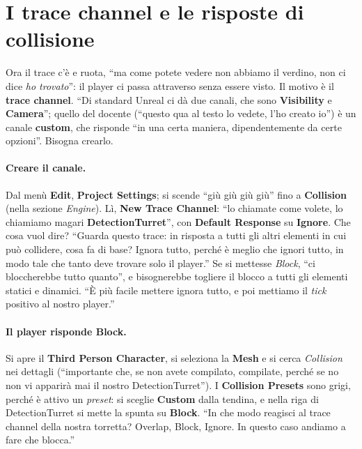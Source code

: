 \section{I trace channel e le risposte di collisione}
\label{ue5:sec:canali}

Ora il trace c'è e ruota, ``ma come potete vedere non abbiamo il verdino, non ci dice
\emph{ho trovato}'': il player ci passa attraverso senza essere visto. Il motivo è il
\textbf{trace channel}. ``Di standard Unreal ci dà due canali, che sono
\textbf{Visibility} e \textbf{Camera}''; quello del docente (``questo qua al testo lo
vedete, l'ho creato io'') è un canale \textbf{custom}, che risponde ``in una certa
maniera, dipendentemente da certe opzioni''. Bisogna crearlo.

\paragraph{Creare il canale.} Dal menù \textbf{Edit}, \textbf{Project Settings}; si scende
``giù giù giù giù'' fino a \textbf{Collision} (nella sezione \emph{Engine}). Lì,
\textbf{New Trace Channel}: ``lo chiamate come volete, lo chiamiamo magari
\textbf{DetectionTurret}'', con \textbf{Default Response} su \textbf{Ignore}. Che cosa
vuol dire? ``Guarda questo trace: in risposta a tutti gli altri elementi in cui può
collidere, cosa fa di base? Ignora tutto, perché è meglio che ignori tutto, in modo tale
che tanto deve trovare solo il player.'' Se si mettesse \emph{Block}, ``ci bloccherebbe
tutto quanto'', e bisognerebbe togliere il blocco a tutti gli elementi statici e
dinamici. ``È più facile mettere ignora tutto, e poi mettiamo il \emph{tick} positivo al
nostro player.''

\paragraph{Il player risponde Block.} Si apre il \textbf{Third Person Character}, si
seleziona la \textbf{Mesh} e si cerca \emph{Collision} nei dettagli (``importante che, se
non avete compilato, compilate, perché se no non vi apparirà mai il nostro
DetectionTurret''). I \textbf{Collision Presets} sono grigi, perché è attivo un
\emph{preset}: si sceglie \textbf{Custom} dalla tendina, e nella riga di DetectionTurret
si mette la spunta su \textbf{Block}. ``In che modo reagisci al trace channel della
nostra torretta? Overlap, Block, Ignore. In questo caso andiamo a fare che blocca.''

